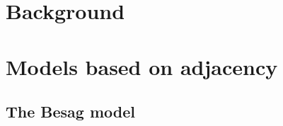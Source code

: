 \documentclass[a4paper, nobind]{templates/ociamthesis}
\begin{document}
\hypertarget{background-1}{%
\section{Background}\label{background-1}}

\hypertarget{models-based-on-adjacency}{%
\section{Models based on adjacency}\label{models-based-on-adjacency}}

\hypertarget{the-besag-model}{%
\subsection{The Besag model}\label{the-besag-model}}
\end{document}
